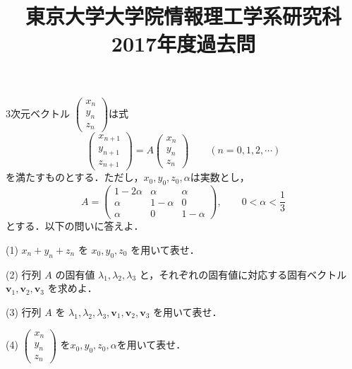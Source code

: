 \documentclass[a4j]{jarticle}
\title{東京大学大学院情報理工学系研究科2017年度過去問}
\author{}
\date{}
\begin{document}
\thispagestyle{empty}
\maketitle
\pagebreak

\section{}

\begin{screen}
 3次元ベクトル $\begin{pmatrix} x_n \\ y_n \\ z_n \end{pmatrix}$は式
 $$\begin{pmatrix} x_{n+1} \\ y_{n+1} \\ z_{n+1} \end{pmatrix} = A\begin{pmatrix} x_n \\ y_n \\ z_n \end{pmatrix} \quad\quad (n=0,1,2,\cdots)$$
 を満たすものとする．ただし，$x_0,y_0,z_0,\alpha$は実数とし，
 $$A=
 \begin{pmatrix}
  1 - 2\alpha & \alpha & \alpha \\
  \alpha & 1-\alpha & 0 \\
  \alpha &  0 & 1-\alpha
 \end{pmatrix}, \quad\quad 0<\alpha < \frac{1}{3}$$
 とする．以下の問いに答えよ．
\end{screen}


\begin{screen}
 (1) $x_n+y_n+z_n$ を $x_0,y_0,z_0$ を用いて表せ．
\end{screen}


\begin{screen}
 (2) 行列 $A$ の固有値 $\lambda_1,\lambda_2,\lambda_3$ と，それぞれの固有値に対応する固有ベクトル $\bm{v}_1,\bm{v}_2,\bm{v}_3$ を求めよ．
\end{screen}


\begin{screen}
 (3) 行列 $A$ を $\lambda_1,\lambda_2,\lambda_3,\bm{v}_1,\bm{v}_2,\bm{v}_3$ を用いて表せ．
\end{screen}


\begin{screen}
 (4) $\begin{pmatrix} x_n \\ y_n \\ z_n \end{pmatrix}$ を$x_0,y_0,z_0,\alpha$を用いて表せ．
\end{screen}
\end{document}
